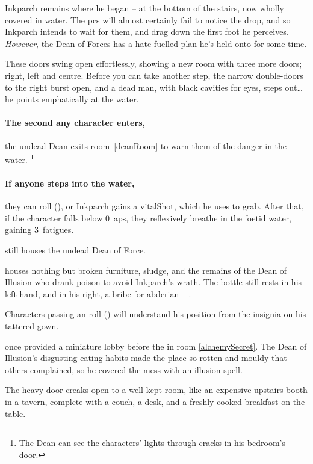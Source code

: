 Inkparch remains where he began -- at the bottom of the stairs, now wholly covered in water.
The \glspl{pc} will almost certainly fail to notice the drop, and so Inkparch intends to wait for them, and drag down the first foot he perceives.
\emph{However}, the Dean of Forces has a hate-fuelled plan he's held onto for some time.

\begin{boxtext}
  These doors swing open effortlessly, showing a new room with three more doors; right, left and centre.
  Before you can take another step, the narrow double-doors to the right burst open, and a dead man, with black cavities for eyes, steps out\ldots
  he points emphatically at the water.
\end{boxtext}

\paragraph{The second any character enters,}
the undead Dean exits room~\ref{deanRoom} to warn them of the danger in the water.%
\footnote{The Dean can see the characters' lights through cracks in his bedroom's door.}

\paragraph{If anyone steps into the water,}
they can roll  (\tn[12]), or Inkparch gains a \gls{vitalShot}, which he uses to grab.%
After that, if the character falls below 0~\glspl{ap}, they reflexively breathe in the foetid water, gaining 3~\glspl{fatigue}.

\setcounter{dlist}{0}
\begin{list}{\bfseries Room~. }{}
  \item
  \label{deanRoom}
  still houses the undead Dean of Force.
  \item
  \label{deadIllusionist}
  houses nothing but broken furniture, sludge, and the remains of the Dean of Illusion who drank poison to avoid Inkparch's wrath.
  The bottle still rests in his left hand, and in his right, a bribe for \gls{abderian} -- \lootBig.

  Characters passing an  roll (\tn[13]) will understand his position from the insignia on his tattered gown.
  \item
  \label{officeEntrance}
  once provided a miniature lobby before the  in room \vref{alchemySecret}.
  The Dean of Illusion's disgusting eating habits made the place so rotten and mouldy that others complained, so he covered the mess with an illusion spell.
  \begin{boxtext}
    The heavy door creaks open to a well-kept room, like an expensive upstairs booth in a tavern, complete with a couch, a desk, and a freshly cooked breakfast on the table.
  \end{boxtext}
\end{list}

